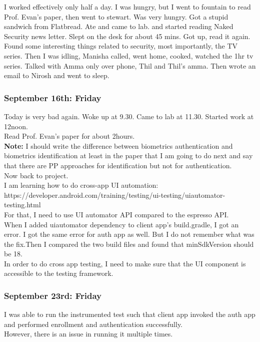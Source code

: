 \documentclass[11pt]{article}
\begin{document}
I worked effectively only half a day. I was hungry, but I went to fountain to read Prof. Evan's paper, then went to stewart. Was very hungry. Got a 
stupid sandwich from Flatbread. Ate and came to lab. and started reading Naked Security news letter. Slept on the desk for about 45 mins. Got up, 
read it again. Found some interesting things related to security, most importantly, the TV series. Then I was idling, Manisha called, went home, 
cooked, watched the 1hr tv series. Talked with Amma only over phone, Thil and Thil's amma. Then wrote an email to Nirosh and went to sleep.

\subsubsection*{September 16th: Friday}
Today is very bad again. Woke up at 9.30. Came to lab at 11.30. Started work at 12noon.\\

Read Prof. Evan's paper for about 2hours.\\

\textbf{Note:} I should write the difference between biometrics authentication and biometrics identification at least in the paper that I am going to 
do next and say that there are PP approaches for identification but not for authentication.\\

Now back to project.\\

I am learning how to do cross-app UI automation: https://developer.android.com/training/testing/ui-testing/uiautomator-testing.html\\
For that, I need to use UI automator API compared to the espresso API.\\

When I added uiautomator dependency to client app's build.gradle, I got an error. I got the same error for auth app as well. But I do not remember 
what was the fix.Then I compared the two build files and found that minSdkVersion should be 18.\\

In order to do cross app testing, I need to make sure that the UI component is accessible to the testing framework.


\subsubsection*{September 23rd: Friday}
I was able to run the instrumented test such that client app invoked the auth app and performed enrollment and authentication successfully.\\
However, there is an issue in running it multiple times.\\
\end{document}
